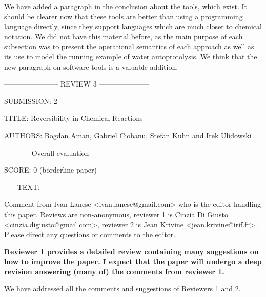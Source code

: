 \documentclass{article}
\begin{document}
We have added a paragraph in the conclusion about the tools, which exist. It should be clearer now
that these tools are better than using a programming language directly, since they support
languages which are much closer to chemical notation. We did not have this material before, 
as the main purpose of each subsection was to present the operational semantics of each approach 
as well as its use to model the running example of water autoprotolysis. We think that the new
paragraph on software tools is a valuable addition. 

----------------------- REVIEW 3 ---------------------

SUBMISSION: 2

TITLE: Reversibility in Chemical Reactions

AUTHORS: Bogdan Aman, Gabriel Ciobanu, Stefan Kuhn and Irek Ulidowski

----------- Overall evaluation -----------

SCORE: 0 (borderline paper)

----- TEXT:

Comment from Ivan Lanese <ivan.lanese@gmail.com> who is the editor handling this paper. Reviews are non-anonymous, reviewer 1 is Cinzia Di Giusto <cinzia.digiusto@gmail.com>, reviewer 2 is Jean Krivine <jean.krivine@irif.fr>. Please direct any questions or comments to the editor.

{\bf
Reviewer 1 provides a detailed review containing many suggestions on how to improve the paper. 
I expect that the paper will undergo a deep revision answering (many of) the comments from reviewer 1.}

We have addressed all the comments and suggestions of Reviewers 1 and 2.
\end{document}
